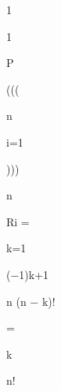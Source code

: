 \documentclass[a4paper,portrait,12pt]{article}
\begin{document}
1





1





\begin{flushleft}
P
\end{flushleft}





(((





\begin{flushleft}
n
\end{flushleft}





\begin{flushleft}
i=1
\end{flushleft}





)))





\begin{flushleft}
n
\end{flushleft}





\begin{flushleft}
Ri =
\end{flushleft}


\begin{flushleft}
k=1
\end{flushleft}





\begin{flushleft}
($-$1)k+1
\end{flushleft}





\begin{flushleft}
n (n $-$ k)!
\end{flushleft}


=


\begin{flushleft}
k
\end{flushleft}


\begin{flushleft}
n!
\end{flushleft}
\end{document}
